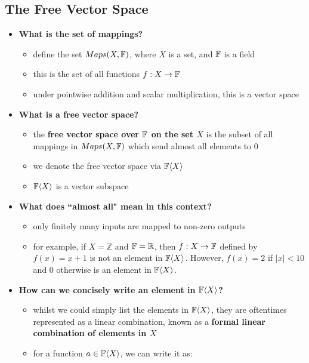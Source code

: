 \documentclass{exam}
\begin{document}
\subsection{The Free Vector Space}

\begin{itemize}
    \item \textbf{What is the set of mappings?}
    \begin{itemize}
        \item define the set $Maps(X, \mathbb{F})$, where $X$ is a set, and $\mathbb{F}$ is a field
        \item this is the set of all functions $f : X \to \mathbb{F}$
        \item under pointwise addition and scalar multiplication, this is a vector space
    \end{itemize}
    \item \textbf{What is a free vector space?}
    \begin{itemize}
        \item the \textbf{free vector space over $\mathbb{F}$ on the set $X$} is the subset of all mappings in $Maps(X, \mathbb{F})$ which send almost all elements to 0
        \item we denote the free vector space via $\mathbb{F}\langle X \rangle$
        \item $\mathbb{F}\langle X \rangle$ is a vector subspace
    \end{itemize}
    \item \textbf{What does ``almost all" mean in this context?}
    \begin{itemize}
        \item only finitely many inputs are mapped to non-zero outputs
        \item for example, if $X=\mathbb{Z}$ and $\mathbb{F}=\mathbb{R}$, then $f : X \to \mathbb{F}$ defined by $f(x)=x+1$ is not an element in $\mathbb{F}\langle X\rangle$. However, $f(x)=2$ if $|x|<10$ and 0 otherwise is an element in $\mathbb{F}\langle X\rangle$.
    \end{itemize}
    \item \textbf{How can we concisely write an element in $\mathbb{F}\langle X \rangle$?}
    \begin{itemize}
        \item whilst we could simply list the elements in $\mathbb{F}\langle X \rangle$, they are oftentimes represented as a linear combination, known as a \textbf{formal linear combination of elements in $X$}
        \item for a function $a \in \mathbb{F}\langle X \rangle$, we can write it as:

\end{itemize}
\end{itemize}
\end{document}
